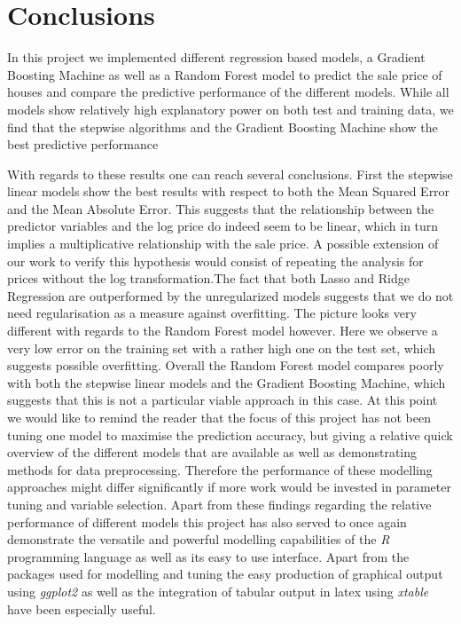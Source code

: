 \section{Conclusions}
In this project we implemented different regression based models, a Gradient Boosting Machine as well as a Random Forest model to predict the sale price of houses and compare the predictive performance of the different models. 
While all models show relatively high explanatory power on both test and training data, we find that the stepwise algorithms and the Gradient Boosting Machine show the best predictive performance

With regards to these results one can reach several conclusions. First the stepwise linear models show the best results with respect to both the Mean Squared Error and the Mean Absolute Error. This suggests that the relationship between the predictor variables and the log price do indeed seem to be linear, which in turn implies a multiplicative relationship with the sale price. A possible extension of our work to verify this hypothesis would consist of repeating the analysis for prices without the log transformation.The fact that both Lasso and Ridge Regression are outperformed by the unregularized models suggests that we do not need regularisation as a measure against overfitting. The picture looks very different with regards to the Random Forest model however. Here we observe a very low error on the training set with a rather high one on the test set, which suggests possible overfitting. Overall the Random Forest model compares poorly with both the stepwise linear models and the Gradient Boosting Machine, which suggests that this is not a particular viable approach in this case. At this point we would like to remind the reader that the focus of this project has not been tuning one model to maximise the prediction accuracy, but giving a relative quick overview of the different models that are available as well as demonstrating methods for data preprocessing. Therefore the performance of these modelling approaches might differ significantly if more work would be invested in parameter tuning and variable selection.
Apart from these findings regarding the relative performance of different models this project has also served to once again demonstrate the versatile and powerful modelling capabilities of the \textit{R} programming language as well as its easy to use interface. Apart from the packages used for modelling and tuning the easy production of graphical output using \textit{ggplot2}  as well as the integration of tabular output in latex using \textit{xtable} have been especially useful. 